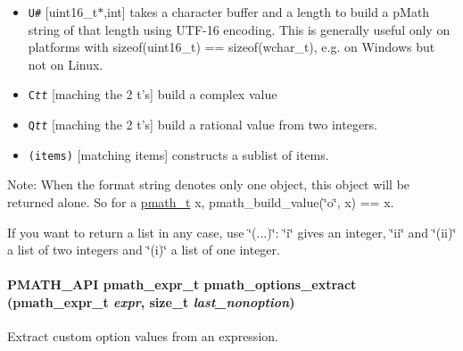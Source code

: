 \begin{itemize}
\item {\tt U\#} \mbox{[}uint16\_\-t$\ast$,int\mbox{]} takes a character buffer and a length to build a pMath string of that length using UTF-16 encoding. This is generally useful only on platforms with sizeof(uint16\_\-t) == sizeof(wchar\_\-t), e.g. on Windows but not on Linux.\end{itemize}


\begin{itemize}
\item {\tt C{\em tt\/}} \mbox{[}maching the 2 t's\mbox{]} build a complex value\item {\tt Q{\em tt\/}} \mbox{[}maching the 2 t's\mbox{]} build a rational value from two integers.\end{itemize}


\begin{itemize}
\item {\tt (items)} \mbox{[}matching items\mbox{]} constructs a sublist of items.\end{itemize}


\begin{Desc}
\item[Note:]When the format string denotes only one object, this object will be returned alone. So for a \hyperlink{classpmath__t}{pmath\_\-t} x, pmath\_\-build\_\-value(\char`\"{}o\char`\"{}, x) == x. \par
 If you want to return a list in any case, use \char`\"{}(...)\char`\"{}: \char`\"{}i\char`\"{} gives an integer, \char`\"{}ii\char`\"{} and \char`\"{}(ii)\char`\"{} a list of two integers and \char`\"{}(i)\char`\"{} a list of one integer. \end{Desc}
\hypertarget{group__helpers_g24403dfbd825b17fc4c6da5973922184}{
\paragraph[{pmath\_\-options\_\-extract}]{\setlength{\rightskip}{0pt plus 5cm}PMATH\_\-API {\bf pmath\_\-expr\_\-t} pmath\_\-options\_\-extract ({\bf pmath\_\-expr\_\-t} {\em expr}, \/  size\_\-t {\em last\_\-nonoption})}\hfill}
\label{group__helpers_g24403dfbd825b17fc4c6da5973922184}


Extract custom option values from an expression. 

